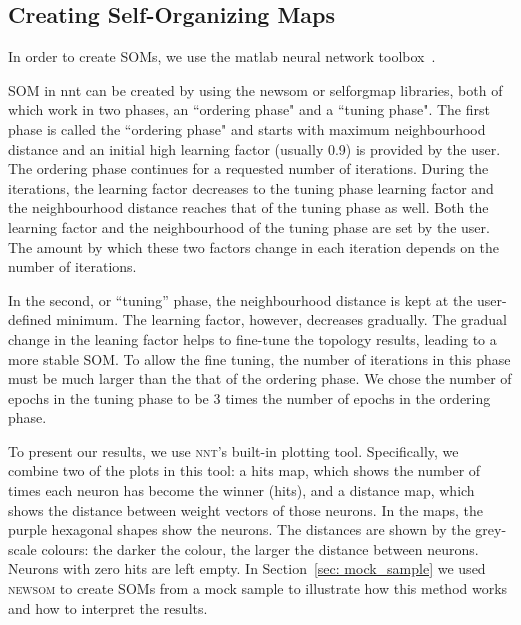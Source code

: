 \subsection{Creating Self-Organizing Maps}
\label{sec: create_som}
     In order to create SOMs, we use the {\sc matlab} neural network toolbox~\citep[NNT,][]{matlabtolbox}.
     
     SOM in {\sc nnt} can be created by using the {\sc newsom} or {\sc selforgmap} libraries, both of which work in two phases, an ``ordering phase" and a ``tuning phase". 
     The first phase is called the ``ordering phase" and
     starts with maximum neighbourhood distance and an initial high learning factor (usually 0.9) is provided by the user. 
     The ordering phase continues for a requested number of iterations.
     During the iterations, the learning factor decreases to the tuning phase learning factor and the neighbourhood distance reaches that of the tuning phase as well.
     Both the learning factor and the neighbourhood of the tuning phase are set by the user. 
     The amount by which these two factors change in each iteration depends on the number of iterations.
     
     In the second, or ``tuning'' phase,
     the neighbourhood distance is kept at the user-defined minimum.
     The learning factor, however, decreases gradually.
     The gradual change in the leaning factor helps to fine-tune the topology results, leading to a more stable SOM. 
     To allow the fine tuning, the number of iterations in this phase must be much larger than the that of the ordering phase.
     We chose the number of epochs in the tuning phase to be 3 times the number of epochs in the ordering phase.
     
     To present our results, we use \textsc{nnt}'s built-in plotting tool.
     Specifically, we combine two of the plots in this tool: a hits map, which shows the number of times each neuron has become the winner (hits), and a distance map, which shows the distance between weight vectors of those neurons.
     In the maps, the purple hexagonal shapes show the neurons. 
     The distances are shown by the grey-scale colours: the darker the colour, the larger the distance between neurons.
     Neurons with zero hits are left empty.
     In Section~\ref{sec: mock_sample} we used \textsc{newsom} to create SOMs from a mock sample to illustrate how this method works and how to interpret the results.

